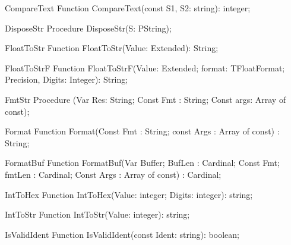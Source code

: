  
\begin{function}{CompareText}
\Declaration
Function CompareText(const S1, S2: string): integer;
\Description
\Errors
\SeeAlso
\end{function}

 
\begin{procedure}{DisposeStr}
\Declaration
Procedure DisposeStr(S: PString);
\Description
\Errors
\SeeAlso
\end{procedure}

 
\begin{function}{FloatToStr}
\Declaration
Function FloatToStr(Value: Extended): String;
\Description
\Errors
\SeeAlso
\end{function}

 
\begin{function}{FloatToStrF}
\Declaration
Function FloatToStrF(Value: Extended; format: TFloatFormat; Precision, Digits: Integer): String;
\Description
\Errors
\SeeAlso
\end{function}

 
\begin{procedure}{FmtStr}
\Declaration
Procedure (Var Res: String; Const Fmt : String; Const args: Array of const);
\Description
\Errors
\SeeAlso
\end{procedure}

 
\begin{function}{Format}
\Declaration
Function Format(Const Fmt : String; const Args : Array of const) : String;
\Description
\Errors
\SeeAlso
\end{function}

 
\begin{function}{FormatBuf}
\Declaration
Function FormatBuf(Var Buffer; BufLen : Cardinal; Const Fmt; fmtLen : Cardinal; Const Args : Array of const) : Cardinal;
\Description
\Errors
\SeeAlso
\end{function}

 
\begin{function}{IntToHex}
\Declaration
Function IntToHex(Value: integer; Digits: integer): string;
\Description
\Errors
\SeeAlso
\end{function}

 
\begin{function}{IntToStr}
\Declaration
Function IntToStr(Value: integer): string;
\Description
\Errors
\SeeAlso
\end{function}

 
\begin{function}{IsValidIdent}
\Declaration
Function IsValidIdent(const Ident: string): boolean;
\Description
\Errors
\SeeAlso
\end{function}

